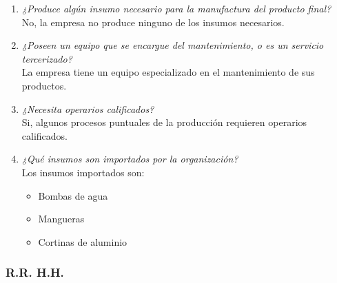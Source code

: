 \documentclass[a4paper,10pt]{article}
\begin{document}
\begin{enumerate}[resume]
				\item \textit{¿Produce algún insumo necesario para la manufactura del producto final?}\\	
				No, la empresa no produce ninguno de los insumos necesarios.
				
				\item \textit{¿Poseen un equipo que se encargue del mantenimiento, o es un servicio tercerizado?}\\	
				La empresa tiene un equipo especializado en el mantenimiento de sus productos.
				
				\item \textit{¿Necesita operarios calificados?}\\	
				Si, algunos procesos puntuales de la producción requieren operarios calificados.
				
				\item \textit{¿Qué insumos son importados por la organización?}\\	
				Los insumos importados son:
				\begin{itemize}
					\item Bombas de agua
					\item Mangueras
					\item Cortinas de aluminio
				\end{itemize}
			
			\end{enumerate}			
			
	\subsubsection{R.R. H.H.}
		
\end{document}
